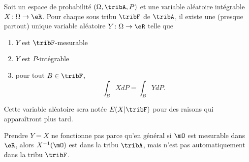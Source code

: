 \begin{theorem}     \label{ThoMWfDPQ}
    Soit un espace de probabilité \( (\Omega,\tribA,P)\) et une variable aléatoire intégrable \( X\colon \Omega\to \eR\). Pour chaque sous tribu \( \tribF\) de \( \tribA\), il existe une (presque partout) unique variable aléatoire \( Y\colon \Omega\to \eR\) telle que
    \begin{enumerate}
        \item
            \( Y\) est \( \tribF\)-mesurable
        \item
            \( Y\) est \( P\)-intégrable
        \item
            pour tout \( B\in\tribF\),
            \begin{equation}        \label{EqBwBkgE}
                \int_{B}XdP=\int_B YdP.
            \end{equation}
    \end{enumerate}
    Cette variable aléatoire sera notée \( E(X|\tribF)\) pour des raisons qui apparaîtront plus tard.
\end{theorem}

\begin{remark}
    Prendre \( Y=X\) ne fonctionne pas parce qu'en général si \( \mO\) est mesurable dans \( \eR\), alors \( X^{-1}(\mO)\) est dans la tribu \( \tribA\), mais n'est pas automatiquement dans la tribu \( \tribF\).
\end{remark}


